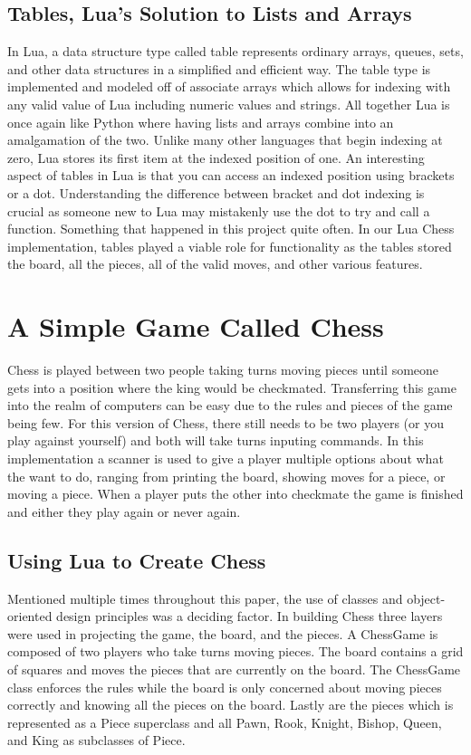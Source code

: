 \documentclass[12pt]{article}
\begin{document}
\subsection{Tables, Lua's Solution to Lists and Arrays} \label{tables} 
In Lua, a data structure type called table represents ordinary arrays, queues, sets, and other data structures in a simplified and efficient way.  The table type is implemented and modeled off of associate arrays which allows for indexing with any valid value of Lua including numeric values and strings.  All together Lua is once again like Python where having lists and arrays combine into an amalgamation of the two.  Unlike many other languages that begin indexing at zero, Lua stores its first item at the indexed position of one.  An interesting aspect of tables in Lua is that you can access an indexed position using brackets or a dot. Understanding the difference between bracket and dot indexing is crucial as someone new to Lua may mistakenly use the dot to try and call a function.  Something that happened in this project quite often.  In our Lua Chess implementation, tables played a viable role for functionality as the tables stored the board, all the pieces, all of the valid moves, and other various features.

\section{A Simple Game Called Chess}
Chess is played between two people taking turns moving pieces until someone gets into a position where the king would be checkmated.  Transferring this game into the realm of computers can be easy due to the rules and pieces of the game being few.  For this version of Chess, there still needs to be two players (or you play against yourself) and both will take turns inputing commands.  In this implementation a scanner is used to give a player multiple options about what the want to do, ranging from printing the board, showing moves for a piece, or moving a piece.  When a player puts the other into checkmate the game is finished and either they play again or never again.

\subsection{Using Lua to Create Chess}
Mentioned multiple times throughout this paper, the use of classes and object-oriented design principles was a deciding factor.  In building Chess three layers were used in projecting the game, the board, and the pieces.  A ChessGame is composed of two players who take turns moving pieces.  The board contains a grid of squares and moves the pieces that are currently on the board.  The ChessGame class enforces the rules while the board is only concerned about moving pieces correctly and knowing all the pieces on the board.  Lastly are the pieces which is represented as a Piece superclass and all Pawn, Rook, Knight, Bishop, Queen, and King as subclasses of Piece.  
\end{document}
